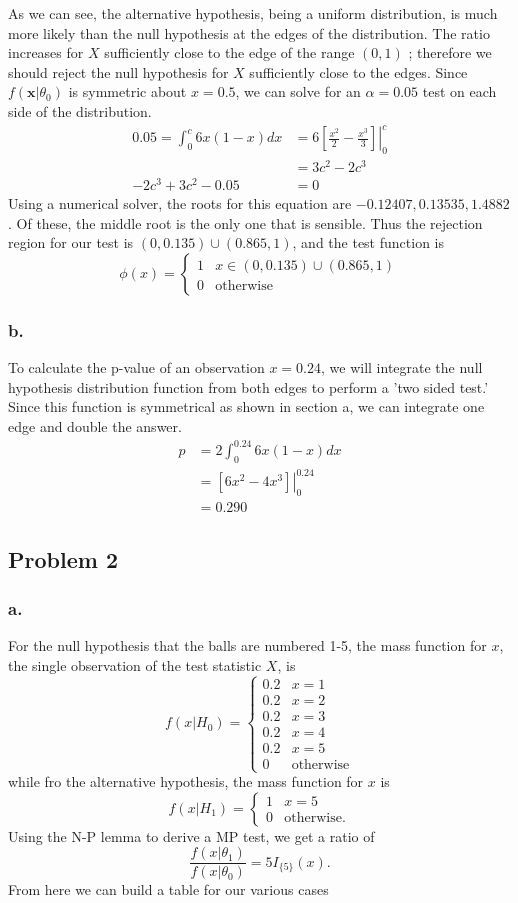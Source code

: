 \documentclass{article}
\begin{document}
As we can see, the alternative hypothesis, being a uniform distribution, is much more likely than the null hypothesis at the edges of the distribution. The ratio increases for $X$ sufficiently close to the edge of the range $(0,1)$ ; therefore we should reject the null hypothesis for $X$ sufficiently close to the edges. Since $f(\mathbf{x}|\theta_0)$ is symmetric about $x=0.5$, we can solve for an $\alpha=0.05$ test on each side of the distribution. 
\begin{align*}
0.05 = \int^c_0 6x(1-x)dx &= 6\left.\left[\frac{x^2}{2}-\frac{x^3}{3}\right]\right|^c_0 \\
&=3c^2-2c^3 \\
-2c^3+3c^2-0.05 &= 0
\end{align*}
Using a numerical solver, the roots for this equation are ${-0.12407, 0.13535, 1.4882}$. Of these, the middle root is the only one that is sensible. Thus the rejection region for our test is $(0, 0.135)\cup(0.865, 1)$, and the test function is 
\[\phi(x) = \begin{cases} 1 & x\in (0, 0.135)\cup(0.865, 1) \\ 0 & \text{otherwise}
\end{cases}
\]
\subsubsection*{b.}
To calculate the p-value of an observation $x = 0.24$, we will integrate the null hypothesis distribution function from both edges to perform a 'two sided test.' Since this function is symmetrical as shown in section a, we can integrate one edge and double the answer. 
\begin{align*}
p &= 2\int_0^{0.24} 6x(1-x)dx \\
&=\left.\left[6x^2-4x^3\right]\right|^{0.24}_0 \\
&=0.290
\end{align*}

\subsection*{Problem 2}
\subsubsection*{a.}
For the null hypothesis that the balls are numbered 1-5, the mass function for $x$, the single observation of the test statistic $X$, is 
\[f(x|H_0) = \begin{cases} 0.2 & x = 1 \\ 0.2 & x = 2 \\ 0.2 & x=3 \\ 0.2 & x=4 \\ 0.2 & x=5 \\ 0 & \text{otherwise}\end{cases}\]
while fro the alternative hypothesis, the mass function for $x$ is
\[f(x|H_1) = \begin{cases} 1 & x = 5 \\ 0 & \text{otherwise}. \end{cases} \]
Using the N-P lemma to derive a MP test, we get a ratio of 
\[\frac{f(x|\theta_1)}{f(x|\theta_0)} = 5I_{\{5\}}(x).\]
From here we can build a table for our various cases
\end{document}
